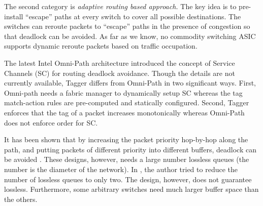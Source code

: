 
The second category is {\em adaptive routing based approach.} The key
idea is to pre-install  ``escape'' paths at every switch to cover all
possible destinations. The switches can reroute packets to ``escape''
paths in the presence of congestion so that deadlock can be avoided.
As far as we know, no commodity switching ASIC supports dynamic reroute
packets based on traffic occupation.

The latest Intel Omni-Path architecture \cite{omnipath} introduced the
concept of Service Channels (SC) for routing deadlock avoidance. Though
the details are not currently available, Tagger differs from Omni-Path
in two significant ways. First, Omni-path needs a fabric manager to
dynamically setup SC whereas the tag match-action rules are
pre-computed and statically configured. Second, Tagger enforces that
the tag of a packet increases monotonically whereas Omni-Path does not
enforce order for SC.

It has been shown that by increasing the packet priority hop-by-hop
along the path, and putting packets of different priority into
different buffers, deadlock can be avoided
\cite{firstpaper,survey,datanetworks,karol2003prevention}. These
designs, however, needs a large number lossless queues (the number is
the diameter of the network). In \cite{dag}, the author tried to reduce
the number of lossless queues to only two. The design, however, does
not guarantee lossless. Furthermore, some arbitrary switches need much
larger buffer space than the others.

